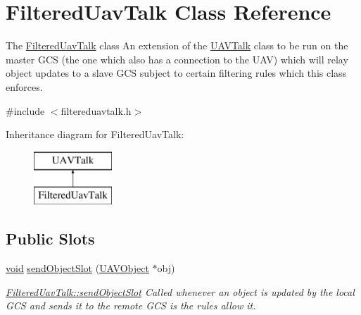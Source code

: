 \hypertarget{class_filtered_uav_talk}{\section{\-Filtered\-Uav\-Talk \-Class \-Reference}
\label{class_filtered_uav_talk}
}


\-The \hyperlink{class_filtered_uav_talk}{\-Filtered\-Uav\-Talk} class \-An extension of the \hyperlink{class_u_a_v_talk}{\-U\-A\-V\-Talk} class to be run on the master \-G\-C\-S (the one which also has a connection to the \-U\-A\-V) which will relay object updates to a slave \-G\-C\-S subject to certain filtering rules which this class enforces.  




{\ttfamily \#include $<$filtereduavtalk.\-h$>$}

\-Inheritance diagram for \-Filtered\-Uav\-Talk\-:\begin{figure}[H]
\begin{center}
\leavevmode
\includegraphics[height=2.000000cm]{class_filtered_uav_talk}
\end{center}
\end{figure}
\subsection*{\-Public \-Slots}
\begin{DoxyCompactItemize}
\item 
\hyperlink{group___u_a_v_objects_plugin_ga444cf2ff3f0ecbe028adce838d373f5c}{void} \hyperlink{group___u_a_v_talk_ga41ca9188bbbc0be7e458f94ef49117df}{send\-Object\-Slot} (\hyperlink{class_u_a_v_object}{\-U\-A\-V\-Object} $\ast$obj)
\begin{DoxyCompactList}\small\item\em \hyperlink{group___u_a_v_talk_ga41ca9188bbbc0be7e458f94ef49117df}{\-Filtered\-Uav\-Talk\-::send\-Object\-Slot} \-Called whenever an object is updated by the local \-G\-C\-S and sends it to the remote \-G\-C\-S is the rules allow it. \end{DoxyCompactList}\end{DoxyCompactItemize}
